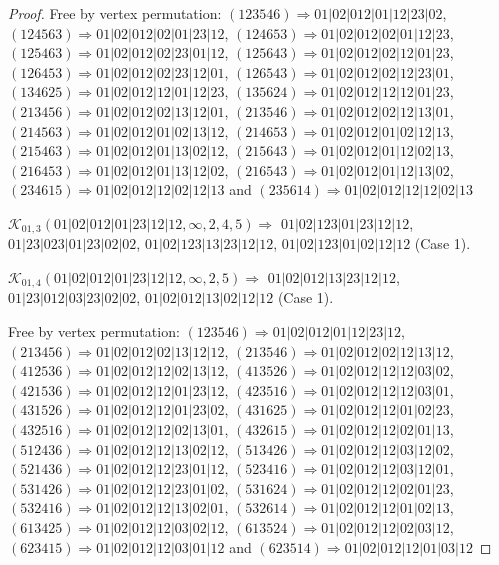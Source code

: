 \documentclass[12pt]{article}
\theoremstyle{plain}
\theoremstyle{definition}
\theoremstyle{remark}
\newcommand{\fancy}[1]{\mathcal{#1}}
\def\K{\fancy{K}}
\begin{document}
\begin{proof}
	Free by vertex permutation: $(1 2 3 5 4 6)\Rightarrow 01|02|012|01|12|23|02$, $(1 2 4 5 6 3)\Rightarrow 01|02|012|02|01|23|12$, $(1 2 4 6 5 3)\Rightarrow 01|02|012|02|01|12|23$, $(1 2 5 4 6 3)\Rightarrow 01|02|012|02|23|01|12$, $(1 2 5 6 4 3)\Rightarrow 01|02|012|02|12|01|23$, $(1 2 6 4 5 3)\Rightarrow 01|02|012|02|23|12|01$, $(1 2 6 5 4 3)\Rightarrow 01|02|012|02|12|23|01$, $(1 3 4 6 2 5)\Rightarrow 01|02|012|12|01|12|23$, $(1 3 5 6 2 4)\Rightarrow 01|02|012|12|12|01|23$, $(2 1 3 4 5 6)\Rightarrow 01|02|012|02|13|12|01$, $(2 1 3 5 4 6)\Rightarrow 01|02|012|02|12|13|01$, $(2 1 4 5 6 3)\Rightarrow 01|02|012|01|02|13|12$, $(2 1 4 6 5 3)\Rightarrow 01|02|012|01|02|12|13$, $(2 1 5 4 6 3)\Rightarrow 01|02|012|01|13|02|12$, $(2 1 5 6 4 3)\Rightarrow 01|02|012|01|12|02|13$, $(2 1 6 4 5 3)\Rightarrow 01|02|012|01|13|12|02$, $(2 1 6 5 4 3)\Rightarrow 01|02|012|01|12|13|02$, $(2 3 4 6 1 5)\Rightarrow 01|02|012|12|02|12|13$ and $(2 3 5 6 1 4)\Rightarrow 01|02|012|12|12|02|13$
	
	
	
	\bigskip
	
	$\K_{01,3}(01|02|012|01|23|12|12,\infty,2, 4, 5)\Rightarrow $ $01|02|123|01|23|12|12$, $01|23|023|01|23|02|02$, $01|02|123|13|23|12|12$, $01|02|123|01|02|12|12$ (Case 1).
	
	$\K_{01,4}(01|02|012|01|23|12|12,\infty,2, 5)\Rightarrow $ $01|02|012|13|23|12|12$, $01|23|012|03|23|02|02$, $01|02|012|13|02|12|12$ (Case 1).
	
	
	
	Free by vertex permutation: $(1 2 3 5 4 6)\Rightarrow 01|02|012|01|12|23|12$, $(2 1 3 4 5 6)\Rightarrow 01|02|012|02|13|12|12$, $(2 1 3 5 4 6)\Rightarrow 01|02|012|02|12|13|12$, $(4 1 2 5 3 6)\Rightarrow 01|02|012|12|02|13|12$, $(4 1 3 5 2 6)\Rightarrow 01|02|012|12|12|03|02$, $(4 2 1 5 3 6)\Rightarrow 01|02|012|12|01|23|12$, $(4 2 3 5 1 6)\Rightarrow 01|02|012|12|12|03|01$, $(4 3 1 5 2 6)\Rightarrow 01|02|012|12|01|23|02$, $(4 3 1 6 2 5)\Rightarrow 01|02|012|12|01|02|23$, $(4 3 2 5 1 6)\Rightarrow 01|02|012|12|02|13|01$, $(4 3 2 6 1 5)\Rightarrow 01|02|012|12|02|01|13$, $(5 1 2 4 3 6)\Rightarrow 01|02|012|12|13|02|12$, $(5 1 3 4 2 6)\Rightarrow 01|02|012|12|03|12|02$, $(5 2 1 4 3 6)\Rightarrow 01|02|012|12|23|01|12$, $(5 2 3 4 1 6)\Rightarrow 01|02|012|12|03|12|01$, $(5 3 1 4 2 6)\Rightarrow 01|02|012|12|23|01|02$, $(5 3 1 6 2 4)\Rightarrow 01|02|012|12|02|01|23$, $(5 3 2 4 1 6)\Rightarrow 01|02|012|12|13|02|01$, $(5 3 2 6 1 4)\Rightarrow 01|02|012|12|01|02|13$, $(6 1 3 4 2 5)\Rightarrow 01|02|012|12|03|02|12$, $(6 1 3 5 2 4)\Rightarrow 01|02|012|12|02|03|12$, $(6 2 3 4 1 5)\Rightarrow 01|02|012|12|03|01|12$ and $(6 2 3 5 1 4)\Rightarrow 01|02|012|12|01|03|12$
	

\end{proof}
\end{document}
